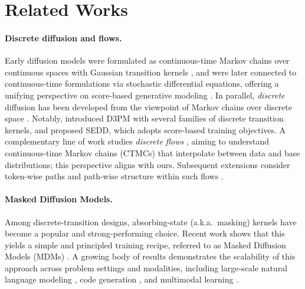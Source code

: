 \section{Related Works}
\label{appendix:related_work}
\paragraph{Discrete diffusion and flows.} Early diffusion models were formulated as continuous-time Markov chains over continuous spaces with Gaussian transition kernels \citep{sohl2015deep,ho2020denoising}, and were later connected to continuous-time formulations via stochastic differential equations, offering a unifying perspective on score-based generative modeling \citep{song2020score}. In parallel, \emph{discrete} diffusion has been developed from the viewpoint of Markov chains over discrete space \citep{hoogeboom2021argmax}. Notably, \citet{austin2021structured} introduced D3PM with several families of discrete transition kernels, and \citet{lou2023discrete} proposed SEDD, which adopts score-based training objectives. A complementary line of work studies \emph{discrete flows} \citep{campbell2024generative,gat2024discrete}, aiming to understand continuous-time Markov chains (CTMCs) that interpolate between data and base distributions; this perspective aligns with ours. Subsequent extensions consider token-wise paths and path-wise structure within such flows \citep{shaul2024flow}.

\paragraph{Masked Diffusion Models.}
Among discrete-transition designs, absorbing-state (a.k.a.\ masking) kernels have become a popular and strong-performing choice. Recent work shows that this yields a simple and principled training recipe, referred to as Masked Diffusion Models (MDMs) \citep{sahoo2024simple,shi2024simplified}. A growing body of results demonstrates the scalability of this approach across problem settings and modalities, including large-scale natural language modeling \citep{nie2024scaling,nie2025large,dream2025,song2025seed,gemini2025diffusion}, code generation \citep{labs2025mercury,gong2025diffucoder}, and multimodal learning \citep{swerdlow2025unified}.

